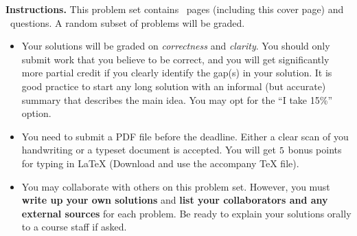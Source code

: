 \noindent \textbf{Instructions.} This problem set contains \numpages\
pages (including this cover page) and \numquestions\ questions. A
random subset of problems will be graded.

\begin{itemize}
\item Your solutions will be graded on \emph{correctness} and
  \emph{clarity}. You should only submit work that you believe to be
  correct, and you will get significantly more partial credit if you
  clearly identify the gap(s) in your solution. It is good practice to
  start any long solution with an informal (but accurate) summary that
  describes the main idea. You may opt for the ``I take 15\%'' option.

\item You need to submit a PDF file before the deadline. Either a
  clear scan of you handwriting or a typeset document is accepted. You
  will get $5$ bonus points for typing in LaTeX (Download and use
  the accompany TeX file).

\item You may collaborate with others on this problem set.  However,
  you must \textbf{{write up your own solutions}} and \textbf{{list
      your collaborators and any external sources}} for each
  problem. Be ready to explain your solutions orally to a course staff
  if asked.

\end{itemize}

\newpage

